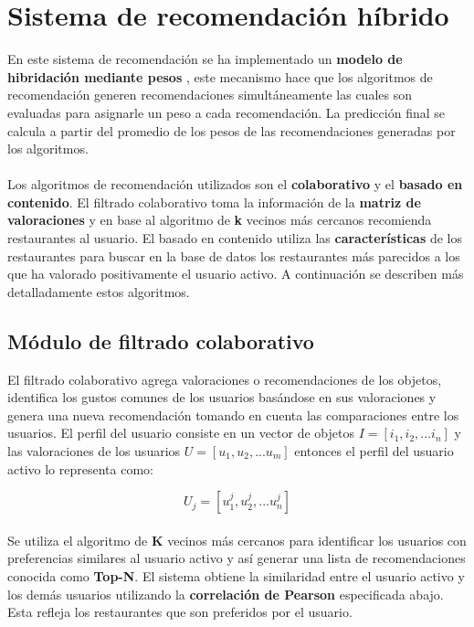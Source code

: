 \documentclass[12pt,letterpaper,oneside] {memoir}
\begin{document}
\section{Sistema de recomendación híbrido}

En este sistema de recomendación se ha implementado un \textbf{modelo de hibridación mediante pesos} \citep{Burke2002}, este mecanismo hace que los algoritmos de recomendación generen recomendaciones simultáneamente las cuales son  evaluadas para asignarle un peso a cada recomendación. La predicción final se calcula a partir del promedio de los pesos de las recomendaciones generadas  por los algoritmos.
\paragraph{}
Los algoritmos de recomendación utilizados son el \textbf{colaborativo} y el \textbf{basado en contenido}. El filtrado colaborativo toma la información de la \textbf{matriz de valoraciones} y en base al algoritmo de \textbf{k} vecinos más cercanos recomienda restaurantes al usuario.  El basado en contenido utiliza las \textbf{características} de los restaurantes  para buscar en la base de datos los restaurantes más parecidos a los que ha valorado positivamente el usuario activo.  A continuación se describen más detalladamente estos algoritmos.

\subsection{Módulo de filtrado colaborativo}

El filtrado colaborativo agrega valoraciones o recomendaciones de los objetos, identifica los gustos comunes de los usuarios basándose en sus valoraciones y genera una nueva recomendación tomando en cuenta las comparaciones entre los usuarios. El perfil del usuario consiste en un vector de objetos \textbf{$\displaystyle I = [ i_{1}, i_{2},...i_{n}] $} y las valoraciones de los usuarios  \textbf{$\displaystyle U = [ u_{1}, u_{2},...u_{m}]$} entonces el perfil del usuario activo lo representa como:

\begin{equation}
\displaystyle U_{j} = [u^{j}_{1}, u^{j}_{2},...u^{j}_{n}]
\end{equation}

\paragraph{}
Se utiliza el algoritmo de \textbf{K} vecinos más cercanos para identificar los usuarios con preferencias similares al usuario activo y así generar una lista de recomendaciones conocida como \textbf{Top-N}.
El sistema obtiene la similaridad entre el usuario activo y los demás usuarios utilizando la \textbf{correlación de Pearson} especificada abajo.  Esta refleja los restaurantes que son preferidos por el usuario. 
\end{document}
